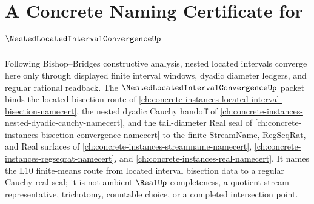 \chapter{A Concrete Naming Certificate for $\NestedLocatedIntervalConvergenceUp$}
\label{ch:concrete-instances-nested-located-interval-convergence-namecert}

Following Bishop--Bridges constructive analysis, nested located intervals converge here only through displayed finite interval windows, dyadic diameter ledgers, and regular rational readback. The $\NestedLocatedIntervalConvergenceUp$ packet binds the located bisection route of \autoref{ch:concrete-instances-located-interval-bisection-namecert}, the nested dyadic Cauchy handoff of \autoref{ch:concrete-instances-nested-dyadic-cauchy-namecert}, and the tail-diameter Real seal of \autoref{ch:concrete-instances-bisection-convergence-namecert} to the finite StreamName, RegSeqRat, and Real surfaces of \autoref{ch:concrete-instances-streamname-namecert}, \autoref{ch:concrete-instances-regseqrat-namecert}, and \autoref{ch:concrete-instances-real-namecert}. It names the L10 finite-means route from located interval bisection data to a regular Cauchy real seal; it is not ambient $\RealUp$ completeness, a quotient-stream representative, trichotomy, countable choice, or a completed intersection point.

